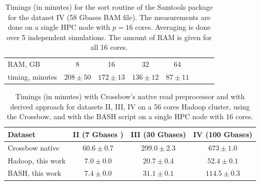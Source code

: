 \documentclass[10pt]{article}
\begin{document}
 \begin{table}[hbtp]
\small

\caption{Timings (in minutes) for the sort routine of the Samtools package for the dataset IV (58 Gbases BAM file). The measurements are done on a single HPC node with $p=16$ cores. Averaging is done over 5 independent simulations. The amount of RAM is given for all 16 cores. }
\begin{center}
\begin{tabular}{|l|c|c|c|c|c|c|c|}
RAM, GB		&	8			&		16			&			32		& 		64				\\
timing, minutes	&	$208\pm50$	&	$172\pm13$		&	$136\pm12$		& 	$87\pm11$			\\
\end{tabular}
\end{center}
\label{table:5}
\normalsize
\end{table}%




\begin{table}[!ht]
\small
\caption{Timings (in minutes) with Crossbow's native read preprocessor and with derived approach for  datasets II, III, IV  on a 56 cores Hadoop cluster, using the Crossbow, and with the BASH script on a single HPC node with 16 cores.}
\begin{center}
\begin{tabular}{l|c|c|c}
Dataset			&		II (7 Gbases )	& III (30 Gbases)	& IV (100 Gbases)\\
\hline
Crossbow native			&		$60.6\pm0.7$	& $299.0\pm2.3$	&	$673\pm1.0$	\\
Hadoop, this work			&		$7.0\pm0.0$	&	$20.7\pm0.4$&		$52.4\pm0.1$\\
BASH, this work			& 		$7.4\pm0.0$	&	$31.1\pm0.1$	&	$114.5\pm0.3$	\\
\end{tabular}
\end{center}
\label{table:preprocess}
\normalsize
\end{table}%
\end{document}
